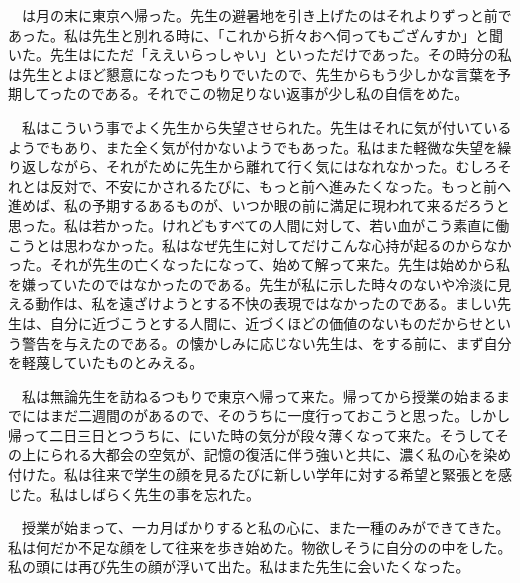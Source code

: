 \documentclass[a4j,onecolumn]{tarticle}
\begin{document}
\par{}
　は月の末に東京へ帰った。\hbox{}先生の避暑地を引き上げたのはそれよりずっと前であった。\hbox{}私は先生と別れる時に、\hbox{}「これから折々おへ伺ってもござんすか」と聞いた。\hbox{}先生はにただ「ええいらっしゃい」といっただけであった。\hbox{}その時分の私は先生とよほど懇意になったつもりでいたので、\hbox{}先生からもう少しかな言葉を予期してったのである。\hbox{}それでこの物足りない返事が少し私の自信をめた。\hbox{}\par{}
　私はこういう事でよく先生から失望させられた。\hbox{}先生はそれに気が付いているようでもあり、\hbox{}また全く気が付かないようでもあった。\hbox{}私はまた軽微な失望を繰り返しながら、\hbox{}それがために先生から離れて行く気にはなれなかった。\hbox{}むしろそれとは反対で、\hbox{}不安にかされるたびに、\hbox{}もっと前へ進みたくなった。\hbox{}もっと前へ進めば、\hbox{}私の予期するあるものが、\hbox{}いつか眼の前に満足に現われて来るだろうと思った。\hbox{}私は若かった。\hbox{}けれどもすべての人間に対して、\hbox{}若い血がこう素直に働こうとは思わなかった。\hbox{}私はなぜ先生に対してだけこんな心持が起るのからなかった。\hbox{}それが先生の亡くなったになって、\hbox{}始めて解って来た。\hbox{}先生は始めから私を嫌っていたのではなかったのである。\hbox{}先生が私に示した時々のないや冷淡に見える動作は、\hbox{}私を遠ざけようとする不快の表現ではなかったのである。\hbox{}ましい先生は、\hbox{}自分に近づこうとする人間に、\hbox{}近づくほどの価値のないものだからせという警告を与えたのである。\hbox{}の懐かしみに応じない先生は、\hbox{}をする前に、\hbox{}まず自分を軽蔑していたものとみえる。\hbox{}\par{}
　私は無論先生を訪ねるつもりで東京へ帰って来た。\hbox{}帰ってから授業の始まるまでにはまだ二週間のがあるので、\hbox{}そのうちに一度行っておこうと思った。\hbox{}しかし帰って二日三日とつうちに、\hbox{}にいた時の気分が段々薄くなって来た。\hbox{}そうしてその上にられる大都会の空気が、\hbox{}記憶の復活に伴う強いと共に、\hbox{}濃く私の心を染め付けた。\hbox{}私は往来で学生の顔を見るたびに新しい学年に対する希望と緊張とを感じた。\hbox{}私はしばらく先生の事を忘れた。\hbox{}\par{}
　授業が始まって、\hbox{}一カ月ばかりすると私の心に、\hbox{}また一種のみができてきた。\hbox{}私は何だか不足な顔をして往来を歩き始めた。\hbox{}物欲しそうに自分のの中をした。\hbox{}私の頭には再び先生の顔が浮いて出た。\hbox{}私はまた先生に会いたくなった。\hbox{}\par{}
\end{document}
